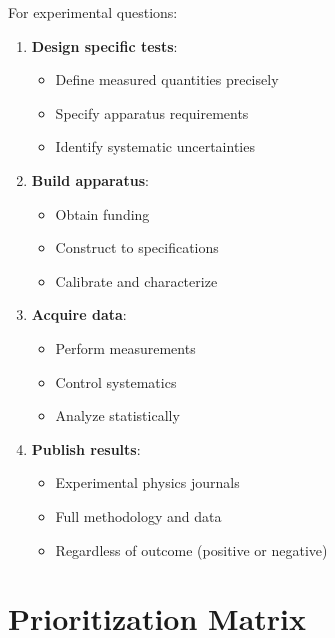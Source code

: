 For experimental questions:

\begin{enumerate}
    \item \textbf{Design specific tests}:
    \begin{itemize}
        \item Define measured quantities precisely
        \item Specify apparatus requirements
        \item Identify systematic uncertainties
    \end{itemize}

    \item \textbf{Build apparatus}:
    \begin{itemize}
        \item Obtain funding
        \item Construct to specifications
        \item Calibrate and characterize
    \end{itemize}

    \item \textbf{Acquire data}:
    \begin{itemize}
        \item Perform measurements
        \item Control systematics
        \item Analyze statistically
    \end{itemize}

    \item \textbf{Publish results}:
    \begin{itemize}
        \item Experimental physics journals
        \item Full methodology and data
        \item Regardless of outcome (positive or negative)
    \end{itemize}
\end{enumerate}

\section{Prioritization Matrix}

